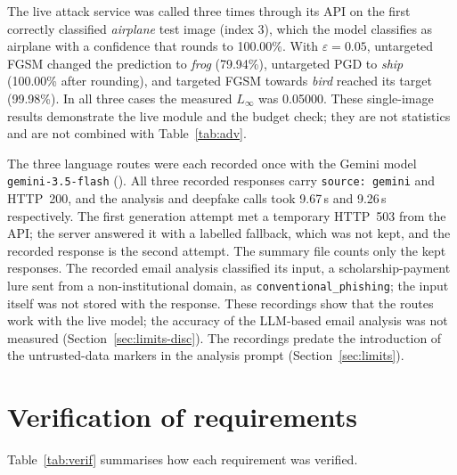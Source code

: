The live attack service was called three times through its API on the first correctly classified \emph{airplane} test image (index 3), which the model classifies as airplane with a confidence that rounds to 100.00\%. With $\varepsilon = 0.05$, untargeted FGSM changed the prediction to \emph{frog} (79.94\%), untargeted PGD to \emph{ship} (100.00\% after rounding), and targeted FGSM towards \emph{bird} reached its target (99.98\%). In all three cases the measured $L_\infty$ was 0.05000. These single-image results demonstrate the live module and the budget check; they are not statistics and are not combined with Table~\ref{tab:adv}.

The three language routes were each recorded once with the Gemini model \texttt{gemini-3.5-flash} (). All three recorded responses carry \texttt{source: gemini} and HTTP~200, and the analysis and deepfake calls took 9.67\,s and 9.26\,s respectively. The first generation attempt met a temporary HTTP~503 from the API; the server answered it with a labelled fallback, which was not kept, and the recorded response is the second attempt. The summary file counts only the kept responses. The recorded email analysis classified its input, a scholarship-payment lure sent from a non-institutional domain, as \texttt{conventional\_phishing}; the input itself was not stored with the response. These recordings show that the routes work with the live model; the accuracy of the LLM-based email analysis was not measured (Section~\ref{sec:limits-disc}). The recordings predate the introduction of the untrusted-data markers in the analysis prompt (Section~\ref{sec:limits}).

\section{Verification of requirements}
\label{sec:eval-req}

Table~\ref{tab:verif} summarises how each requirement was verified.

